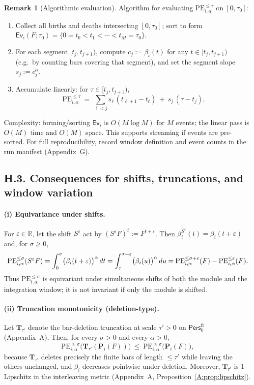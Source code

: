 \documentclass[11pt]{article}
\numberwithin{equation}{section}
\theoremstyle{plain}
\theoremstyle{definition}
\theoremstyle{remark}
\newcommand{\Pers}{\mathsf{Pers}}
\theoremstyle{plain}
\theoremstyle{definition}
\numberwithin{equation}{section}
\theoremstyle{definition}
\newtheorem{remark}[theorem]{Remark}
\numberwithin{equation}{section}
\theoremstyle{plain}
\theoremstyle{definition}
\theoremstyle{remark}
\providecommand{\n}{\unskip\space}
\begin{document}
\begin{remark}[Algorithmic evaluation]\label{H:rk:algo}
Algorithm for evaluating $\mathrm{PE}_{i,\alpha}^{\le \tau}$ on $[0,\tau_0]$:
\begin{enumerate}
  \item Collect all births and deaths intersecting $[0,\tau_0]$; sort to form $\mathsf{Ev}_i(F;\tau_0)=\{0=t_0<t_1<\cdots<t_M=\tau_0\}$.
  \item For each segment $[t_j,t_{j+1})$, compute $c_j:=\beta_i(t)$ for any $t\in[t_j,t_{j+1})$ (e.g.\ by counting bars covering that segment), and set the segment slope $s_j:=c_j^{\alpha}$.
  \item Accumulate linearly: for $\tau\in[t_j,t_{j+1})$,
  \[
  \mathrm{PE}_{i,\alpha}^{\le \tau}\ =\ \sum_{\ell<j} s_\ell\,(t_{\ell+1}-t_\ell)\ +\ s_j\,(\tau-t_j).
  \]
\end{enumerate}
Complexity: forming/sorting $\mathsf{Ev}_i$ is $O(M\log M)$ for $M$ events; the linear pass is $O(M)$ time and $O(M)$ space. This supports streaming if events are pre-sorted.
For full reproducibility, record window definition and event counts in the run manifest (Appendix~G).
\end{remark}

\subsection*{H.3. Consequences for shifts, truncations, and window variation}

\paragraph{(i) Equivariance under shifts.}
For $\varepsilon\in\mathbb{R}$, let the shift $S^\varepsilon$ act by $(S^\varepsilon F)^t:=F^{t+\varepsilon}$. Then $\beta_i^{S^\varepsilon}(t)=\beta_i(t+\varepsilon)$ and, for $\sigma\ge 0$,
\[
\mathrm{PE}_{i,\alpha}^{\le \sigma}(S^\varepsilon F)\n=\int_{0}^{\sigma}\bigl(\beta_i(t+\varepsilon)\bigr)^{\alpha}\,dt\n=\int_{\varepsilon}^{\sigma+\varepsilon}\bigl(\beta_i(u)\bigr)^{\alpha}\,du\n=\mathrm{PE}_{i,\alpha}^{\le \sigma+\varepsilon}(F)-\mathrm{PE}_{i,\alpha}^{\le \varepsilon}(F).
\]
Thus $\mathrm{PE}_{i,\alpha}^{\le \sigma}$ is equivariant under simultaneous shifts of both the module and the integration window; it is not invariant if only the module is shifted.

\paragraph{(ii) Truncation monotonicity (deletion-type).}
Let $\mathbf{T}_{\tau'}$ denote the bar-deletion truncation at scale $\tau'>0$ on $\Pers^{\mathrm{ft}}_k$ (Appendix~A). Then, for every $\sigma>0$ and every $\alpha>0$,
\[
\mathrm{PE}_{i,\alpha}^{\le \sigma}\!\big(\mathbf{T}_{\tau'}(\mathbf{P}_i(F))\big)\ \le\ \mathrm{PE}_{i,\alpha}^{\le \sigma}\!\big(\mathbf{P}_i(F)\big),
\]
because $\mathbf{T}_{\tau'}$ deletes precisely the finite bars of length $\le \tau'$ while leaving the others unchanged, and $\beta_i$ decreases pointwise under deletion. Moreover, $\mathbf{T}_{\tau'}$ is $1$-Lipschitz in the interleaving metric (Appendix~A, Proposition~\ref{A:prop:lipschitz}).
\end{document}
